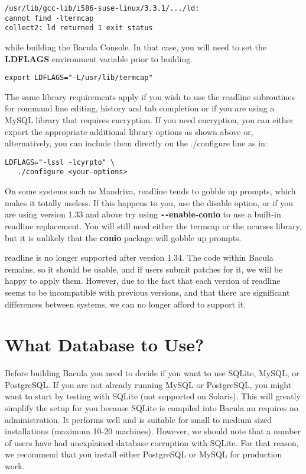 \footnotesize
\begin{verbatim}
/usr/lib/gcc-lib/i586-suse-linux/3.3.1/.../ld:
cannot find -ltermcap
collect2: ld returned 1 exit status
\end{verbatim}
\normalsize

while building the Bacula Console. In that case, you will need to set the {\bf
LDFLAGS} environment variable prior to building. 

\footnotesize
\begin{verbatim}
export LDFLAGS="-L/usr/lib/termcap"
\end{verbatim}
\normalsize

The same library requirements apply if you wish to use the readline subroutines
for command line editing, history and tab completion or if you are using a
MySQL library that requires encryption. If you need encryption, you can either
export the appropriate additional library options as shown above or,
alternatively, you can include them directly on the ./configure line as in:

\footnotesize
\begin{verbatim}
LDFLAGS="-lssl -lcyrpto" \
   ./configure <your-options>
\end{verbatim}
\normalsize

On some systems such as Mandriva, readline tends to
gobble up prompts, which makes it totally useless. If this happens to you, use
the disable option, or if you are using version 1.33 and above try using {\bf
\verb:--:enable-conio} to use a built-in readline replacement. You will still need
either the termcap or the ncurses library, but it is unlikely that the {\bf conio}
package will gobble up prompts. 

readline is no longer supported after version 1.34.  The code within Bacula
remains, so it should be usable, and if users submit patches for it, we will
be happy to apply them.  However, due to the fact that each version of
readline seems to be incompatible with previous versions, and that there
are significant differences between systems, we can no longer afford to
support it.

\section{What Database to Use?}
\label{DB}

Before building Bacula you need to decide if you want to use SQLite, MySQL, or
PostgreSQL. If you are not already running MySQL or PostgreSQL, you might
want to start by testing with SQLite (not supported on Solaris).
This will greatly simplify the setup for you
because SQLite is compiled into Bacula an requires no administration. It
performs well and is suitable for small to medium sized installations (maximum
10-20 machines). However, we should note that a number of users have
had unexplained database corruption with SQLite. For that reason, we
recommend that you install either PostgreSQL or MySQL for production
work.

